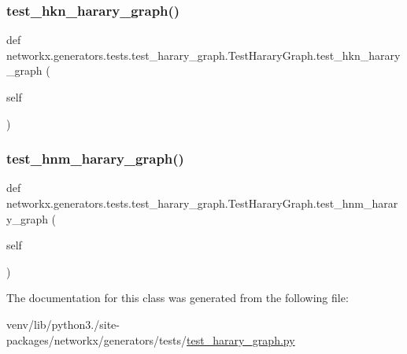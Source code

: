 \subsubsection{\texorpdfstring{test\+\_\+hkn\+\_\+harary\+\_\+graph()}{test\_hkn\_harary\_graph()}}
{\footnotesize\ttfamily def networkx.\+generators.\+tests.\+test\+\_\+harary\+\_\+graph.\+Test\+Harary\+Graph.\+test\+\_\+hkn\+\_\+harary\+\_\+graph (\begin{DoxyParamCaption}\item[{}]{self }\end{DoxyParamCaption})}

\mbox{\label{classnetworkx_1_1generators_1_1tests_1_1test__harary__graph_1_1TestHararyGraph_a06834b6bec625dd8fac686c270b2dfea}} 
\subsubsection{\texorpdfstring{test\+\_\+hnm\+\_\+harary\+\_\+graph()}{test\_hnm\_harary\_graph()}}
{\footnotesize\ttfamily def networkx.\+generators.\+tests.\+test\+\_\+harary\+\_\+graph.\+Test\+Harary\+Graph.\+test\+\_\+hnm\+\_\+harary\+\_\+graph (\begin{DoxyParamCaption}\item[{}]{self }\end{DoxyParamCaption})}



The documentation for this class was generated from the following file\+:\begin{DoxyCompactItemize}
\item 
venv/lib/python3./site-\/packages/networkx/generators/tests/\hyperlink{test__harary__graph_8py}{test\+\_\+harary\+\_\+graph.\+py}\end{DoxyCompactItemize}
